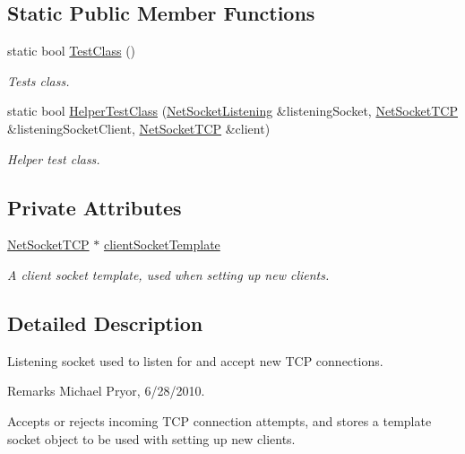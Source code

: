 \subsection*{Static Public Member Functions}
\begin{DoxyCompactItemize}
\item 
static bool \hyperlink{class_net_socket_listening_a397dd748e239d7638ead233d55c9b0dc}{TestClass} ()
\begin{DoxyCompactList}\small\item\em Tests class. \item\end{DoxyCompactList}\item 
static bool \hyperlink{class_net_socket_listening_af676aa9c97ac043095f42f0800e68a1b}{HelperTestClass} (\hyperlink{class_net_socket_listening}{NetSocketListening} \&listeningSocket, \hyperlink{class_net_socket_t_c_p}{NetSocketTCP} \&listeningSocketClient, \hyperlink{class_net_socket_t_c_p}{NetSocketTCP} \&client)
\begin{DoxyCompactList}\small\item\em Helper test class. \item\end{DoxyCompactList}\end{DoxyCompactItemize}
\subsection*{Private Attributes}
\begin{DoxyCompactItemize}
\item 
\hyperlink{class_net_socket_t_c_p}{NetSocketTCP} $\ast$ \hyperlink{class_net_socket_listening_a7356aeb773bfca9a4997ac6bc120c348}{clientSocketTemplate}
\begin{DoxyCompactList}\small\item\em A client socket template, used when setting up new clients. \item\end{DoxyCompactList}\end{DoxyCompactItemize}


\subsection{Detailed Description}
Listening socket used to listen for and accept new TCP connections. \begin{DoxyRemark}{Remarks}
Michael Pryor, 6/28/2010.
\end{DoxyRemark}
Accepts or rejects incoming TCP connection attempts, and stores a template socket object to be used with setting up new clients. 

